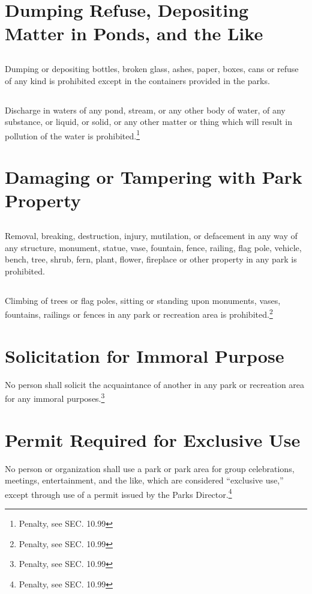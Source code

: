\section{Dumping Refuse, Depositing Matter in Ponds, and the Like}
\subsection{}
Dumping or depositing bottles, broken glass, ashes, paper, boxes, cans or refuse of any kind is prohibited except in the containers provided in the parks.
\subsection{}
Discharge in waters of any pond, stream, or any other body of water, of any substance, or liquid, or solid, or any other matter or thing which will result in pollution of the water is prohibited.\footnote{Penalty, see SEC. 10.99}

\section{Damaging or Tampering with Park Property}
\subsection{}
Removal, breaking, destruction, injury, mutilation, or defacement in any way of any structure, monument, statue, vase, fountain, fence, railing, flag pole, vehicle, bench, tree, shrub, fern, plant, flower, fireplace or other property in any park is prohibited.
\subsection{}
Climbing of trees or flag poles, sitting or standing upon monuments, vases, fountains, railings or fences in any park or recreation area is prohibited.\footnote{Penalty, see SEC. 10.99}

\section{Solicitation for Immoral Purpose}
No person shall solicit the acquaintance of another in any park or recreation area for any immoral purposes.\footnote{Penalty, see SEC. 10.99}

\section{Permit Required for Exclusive Use}
No person or organization shall use a park or park area for group celebrations, meetings, entertainment, and the like, which are considered “exclusive use,” except through use of a permit issued by the Parks Director.\footnote{Penalty, see SEC. 10.99}
